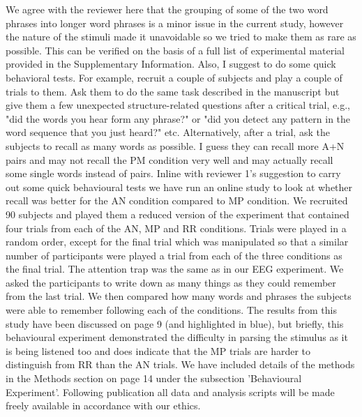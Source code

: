 \documentclass[10pt,letterpaper]{article}
\begin{document}
\color{blue}
We agree with the reviewer here that the grouping of some of the two word phrases into longer word phrases is a minor issue in the current study, however the nature of the stimuli made it unavoidable so we tried to make them as rare as possible. This can be verified on the basis of a full list of experimental material provided in the Supplementary Information.
\newline
\noindent
\color{black}
Also, I suggest to do some quick behavioral tests. For example, recruit a couple of subjects and play a couple of trials to them. Ask them to do the same task described in the manuscript but give them a few unexpected structure-related questions after a critical trial, e.g., "did the words you hear form any phrase?" or "did you detect any pattern in the word sequence that you just heard?" etc. Alternatively, after a trial, ask the subjects to recall as many words as possible. I guess they can recall more A+N pairs and may not recall the PM condition very well and may actually recall some single words instead of pairs.
\color{blue}
\newline
\indent
Inline with reviewer 1’s suggestion to carry out some quick behavioural tests we have run an online study to look at whether recall was better for the AN condition compared to MP condition. We recruited 90 subjects and played them a reduced version of the experiment that contained four trials from each of the AN, MP and RR conditions. Trials were played in a random order, except for the final trial which was manipulated so that a similar number of participants were played a trial from each of the three conditions as the final trial. The attention trap was the same as in our EEG experiment. We asked the participants to write down as many things as they could remember from the last trial. We then compared how many words and phrases the subjects were able to remember following each of the conditions. The results from this study have been discussed on page 9 (and highlighted in blue), but briefly, this behavioural experiment demonstrated the difficulty in parsing the stimulus as it is being listened too and does indicate that the MP trials are harder to distinguish from RR than the AN trials. 
We have included details of the methods in the Methods section on page 14 under the subsection 'Behavioural Experiment'. Following publication all data and analysis scripts will be made freely available in accordance with our ethics.
\end{document}
